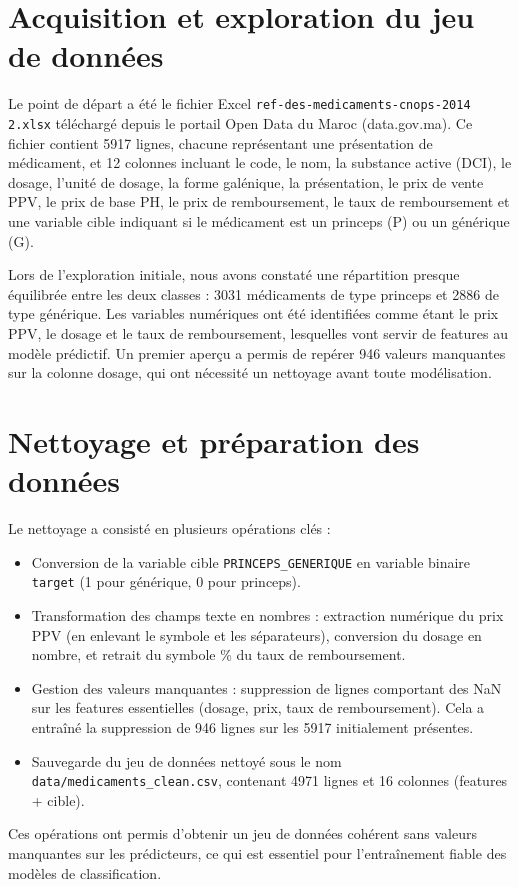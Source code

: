 \documentclass[12pt,a4paper]{report}
\begin{document}
\section{Acquisition et exploration du jeu de données}
Le point de départ a été le fichier Excel \texttt{ref-des-medicaments-cnops-2014 2.xlsx} téléchargé depuis le portail Open Data du Maroc (data.gov.ma). Ce fichier contient 5917 lignes, chacune représentant une présentation de médicament, et 12 colonnes incluant le code, le nom, la substance active (DCI), le dosage, l'unité de dosage, la forme galénique, la présentation, le prix de vente PPV, le prix de base PH, le prix de remboursement, le taux de remboursement et une variable cible indiquant si le médicament est un princeps (P) ou un générique (G). 

Lors de l'exploration initiale, nous avons constaté une répartition presque équilibrée entre les deux classes : 3031 médicaments de type princeps et 2886 de type générique. Les variables numériques ont été identifiées comme étant le prix PPV, le dosage et le taux de remboursement, lesquelles vont servir de features au modèle prédictif. Un premier aperçu a permis de repérer 946 valeurs manquantes sur la colonne dosage, qui ont nécessité un nettoyage avant toute modélisation.

\section{Nettoyage et préparation des données}
Le nettoyage a consisté en plusieurs opérations clés :
\begin{itemize}
    \item Conversion de la variable cible \texttt{PRINCEPS\_GENERIQUE} en variable binaire \texttt{target} (1 pour générique, 0 pour princeps).
    \item Transformation des champs texte en nombres : extraction numérique du prix PPV (en enlevant le symbole \texteuro{} et les séparateurs), conversion du dosage en nombre, et retrait du symbole \% du taux de remboursement.
    \item Gestion des valeurs manquantes : suppression de lignes comportant des NaN sur les features essentielles (dosage, prix, taux de remboursement). Cela a entraîné la suppression de 946 lignes sur les 5917 initialement présentes.
    \item Sauvegarde du jeu de données nettoyé sous le nom \texttt{data/medicaments\_clean.csv}, contenant 4971 lignes et 16 colonnes (features + cible).
\end{itemize}
Ces opérations ont permis d'obtenir un jeu de données cohérent sans valeurs manquantes sur les prédicteurs, ce qui est essentiel pour l'entraînement fiable des modèles de classification.
\end{document}

